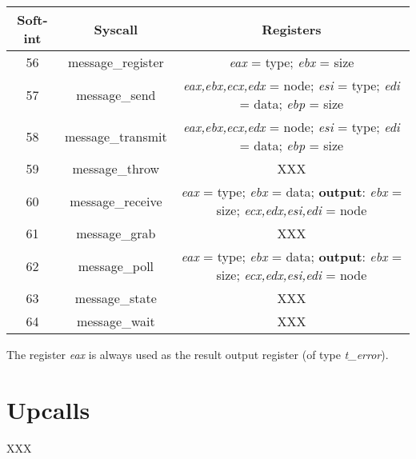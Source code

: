 \begin{center}
\begin{tabular}{| c | c | c |}
\hline
Soft-int & Syscall           & Registers \\
\hline
56       & message\_register & \textit{eax} = type; \textit{ebx} = size \\
\hline
57       & message\_send     & \textit{eax,ebx,ecx,edx} = node; \textit{esi} = type; \textit{edi} = data; \textit{ebp} = size \\
\hline
58       & message\_transmit & \textit{eax,ebx,ecx,edx} = node; \textit{esi} = type; \textit{edi} = data; \textit{ebp} = size \\
\hline
59       & message\_throw    & XXX \\
\hline
60       & message\_receive  & \textit{eax} = type; \textit{ebx} = data; \textbf{output}: \textit{ebx} = size; \textit{ecx,edx,esi,edi} = node \\
\hline
61       & message\_grab     & XXX \\
\hline
62       & message\_poll     & \textit{eax} = type; \textit{ebx} = data; \textbf{output}: \textit{ebx} = size; \textit{ecx,edx,esi,edi} = node \\
\hline
63       & message\_state    & XXX \\
\hline
64       & message\_wait     & XXX \\
\hline
\end{tabular}
\end{center}

The register \textit{eax} is always used as the result output register
(of type \textit{t\_error}).

%
%

\section{Upcalls}

XXX